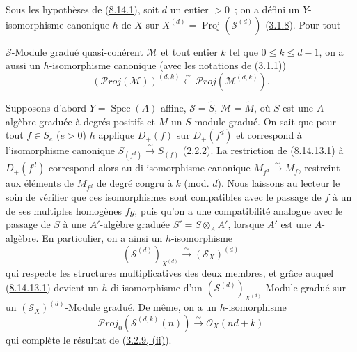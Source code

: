 \begin{remark}[8.14.13]
\label{II.8.14.13-fr}
Sous les hypothèses de (\hyperref[II.8.14.1-fr]{8.14.1}), soit $d$ un entier
$>0$~; on a défini un $Y$-isomorphisme canonique $h$ de $X$ sur
$X^{(d)}=\operatorname{Proj}(\mathcal{S}^{(d)})$
(\hyperref[II.3.1.8-fr]{3.1.8}). Pour tout

$\mathcal{S}$-Module gradué quasi-cohérent $\mathcal{M}$ et tout entier $k$
tel que $0\leqslant k\leqslant d-1$, on a aussi un $h$-isomorphisme canonique
(avec les notations de (\hyperref[II.3.1.1-fr]{3.1.1}))
\begin{equation}
\label{II.8.14.13.1-fr}
  (\mathcal{P}\mathit{roj}(\mathcal{M}))^{(d,k)}
  \xleftarrow{\sim}\mathcal{P}\mathit{roj}(\mathcal{M}^{(d,k)}).
\tag{8.14.13.1}
\end{equation}

Supposons d'abord $Y=\operatorname{Spec}(A)$ affine,
$\mathcal{S}=\widetilde{S}$, $\mathcal{M}=\widetilde{M}$, où $S$ est une
$A$-algèbre graduée à degrés positifs et $M$ un $S$-module gradué. On sait
que pour tout $f\in S_e$ ($e>0$) $h$ applique $D_+(f)$ sur $D_+(f^d)$ et
correspond à l'isomorphisme canonique
$S_{(f^d)}\xrightarrow{\sim}S_{(f)}$
(\hyperref[II.2.2.2-fr]{2.2.2}). La restriction de
(\hyperref[II.8.14.13.1-fr]{8.14.13.1}) à $D_+(f^d)$ correspond alors au
di-isomorphisme canonique $M_{f^d}\xrightarrow{\sim}M_f$, restreint aux
éléments de $M_{f^d}$ de degré congru à $k$ (mod. $d$). Nous laissons au
lecteur le soin de vérifier que ces isomorphismes sont compatibles avec le
passage de $f$ à un de ses multiples homogènes $fg$, puis qu'on a une
compatibilité analogue avec le passage de $S$ à une $A'$-algèbre graduée
$S'=S\otimes_A A'$, lorsque $A'$ est une $A$-algèbre.
En particulier, on a ainsi un $h$-isomorphisme
\begin{equation}
\label{II.8.14.13.2-fr}
  (\mathcal{S}^{(d)})_{X^{(d)}}
  \xrightarrow{\sim}(\mathcal{S}_X)^{(d)}
\tag{8.14.13.2}
\end{equation}
qui respecte les structures multiplicatives des deux membres, et grâce auquel
(\hyperref[II.8.14.13.1-fr]{8.14.13.1}) devient un $h$-di-isomorphisme d'un
$(\mathcal{S}^{(d)})_{X^{(d)}}$-Module gradué sur un
$(\mathcal{S}_X)^{(d)}$-Module gradué. De même, on a un $h$-isomorphisme
\begin{equation}
\label{II.8.14.13.3-fr}
  \mathcal{P}\mathit{roj}_0(\mathcal{S}^{(d,k)}(n))
  \xrightarrow{\sim}\mathcal{O}_X(nd+k)
\tag{8.14.13.3}
\end{equation}
qui complète le résultat de (\hyperref[II.3.2.9-fr]{3.2.9, (ii)}).


\end{remark}
